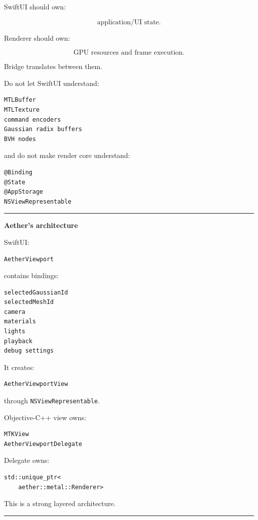 SwiftUI should own:

\[
\text{application/UI state}.
\]

Renderer should own:

\[
\text{GPU resources and frame execution}.
\]

Bridge translates between them.

Do not let SwiftUI understand:

\begin{verbatim}
MTLBuffer
MTLTexture
command encoders
Gaussian radix buffers
BVH nodes
\end{verbatim}

and do not make render core understand:

\begin{verbatim}
@Binding
@State
@AppStorage
NSViewRepresentable
\end{verbatim}

\begin{center}\rule{0.5\linewidth}{0.5pt}\end{center}

\textbf{Aether's architecture}

SwiftUI:

\begin{verbatim}
AetherViewport
\end{verbatim}

contains bindings:

\begin{verbatim}
selectedGaussianId
selectedMeshId
camera
materials
lights
playback
debug settings
\end{verbatim}

It creates:

\begin{verbatim}
AetherViewportView
\end{verbatim}

through \texttt{NSViewRepresentable}.

Objective-C++ view owns:

\begin{verbatim}
MTKView
AetherViewportDelegate
\end{verbatim}

Delegate owns:

\begin{verbatim}
std::unique_ptr<
    aether::metal::Renderer>
\end{verbatim}

This is a strong layered architecture.

\begin{center}\rule{0.5\linewidth}{0.5pt}\end{center}

